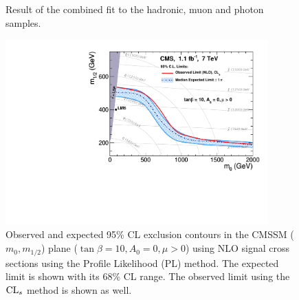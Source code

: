 \begin{figure}[t]
\begin{center}
\hspace{0.3cm} 
    \caption{\label{fig:fitresult} Result of the combined fit to the
      hadronic, muon and photon samples.
}
  \end{center}
\end{figure}

\begin{figure}[t]
  \begin{center}
    \includegraphics[width = 0.90\textwidth]{figures/RA1_ExclusionLimit_tanb10.pdf}
    \caption{\label{fig:cmssm} Observed and expected 95\% CL exclusion
      contours in the CMSSM ($m_0, m_{1/2}$) plane ($\tan \beta = 10,
      A_0 = 0, \mu > 0$) using NLO signal cross sections using the
      Profile Likelihood (PL) method. The expected limit is shown with
      its 68\% CL range.  The observed limit using the $\mbox{CL$_s$}$ method is
      shown as well.  }
  \end{center}
\end{figure}



